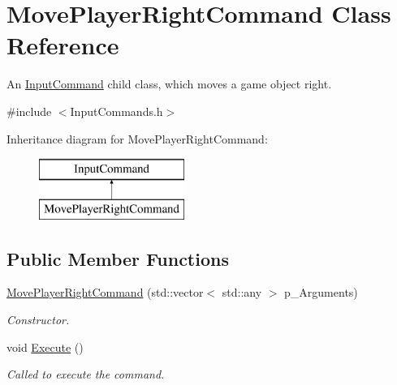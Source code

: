 \hypertarget{class_move_player_right_command}{}\section{Move\+Player\+Right\+Command Class Reference}
\label{class_move_player_right_command}


An \mbox{\hyperlink{class_input_command}{Input\+Command}} child class, which moves a game object right.  




{\ttfamily \#include $<$Input\+Commands.\+h$>$}

Inheritance diagram for Move\+Player\+Right\+Command\+:\begin{figure}[H]
\begin{center}
\leavevmode
\includegraphics[height=2.000000cm]{class_move_player_right_command}
\end{center}
\end{figure}
\subsection*{Public Member Functions}
\begin{DoxyCompactItemize}
\item 
\mbox{\hyperlink{class_move_player_right_command_a9ee41f241e72a1d38f6ab2eeaac240e0}{Move\+Player\+Right\+Command}} (std\+::vector$<$ std\+::any $>$ p\+\_\+\+Arguments)
\begin{DoxyCompactList}\small\item\em Constructor. \end{DoxyCompactList}\item 
\mbox{\label{class_move_player_right_command_a44a7cf58b5799fd35df2d5d1c28c4f43}} 
void \mbox{\hyperlink{class_move_player_right_command_a44a7cf58b5799fd35df2d5d1c28c4f43}{Execute}} ()
\begin{DoxyCompactList}\small\item\em Called to execute the command. \end{DoxyCompactList}\end{DoxyCompactItemize}

